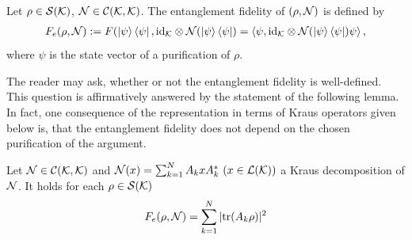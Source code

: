 \begin{definition}
Let $\rho \in {\mathcal S}({\mathcal K})$, ${\mathcal N} \in {\mathcal C}({\mathcal K},{\mathcal K})$.  The entanglement fidelity of $(\rho, {\mathcal N})$ is defined by
\begin{align}
 F_e(\rho, {\mathcal N}) := F(\ket{\psi} \bra{\psi}, \mathrm{id}_{{\mathcal K}} \otimes {\mathcal N}(\ket{\psi}\bra{\psi}) = \braket{\psi, \mathrm{id}_{{\mathcal K}} \otimes {\mathcal N} (\ket{\psi}\bra{\psi}) \psi},
\end{align}
where $\psi$ is the state vector of a purification of $\rho$. 
\end{definition}
 The reader may ask, whether or not the entanglement fidelity is well-defined. This question is affirmatively answered by the statement of the following lemma. In fact, one consequence of the 
 representation in terms of Kraus operators given below is, that the entanglement fidelity does 
 not depend on the chosen purification of the argument.
\begin{lemma} \label{lemma:entanglement_fidelity_kraus_dec}
 Let ${\mathcal N} \in {\mathcal C}({\mathcal K}, {\mathcal K})$ and
 $
  {\mathcal N}(x) = \sum_{k=1}^N A_k x A_k^\ast  \ (x \in {\mathcal L}({\mathcal K}))
 $
 a Kraus decomposition of ${\mathcal N}$. It holds for each $\rho \in {\mathcal S}({\mathcal K})$
 \begin{align}
  F_e(\rho,{\mathcal N}) = \sum_{k=1}^N |\mathrm{tr}(A_k\rho)|^2 
 \end{align}
  \end{lemma}
